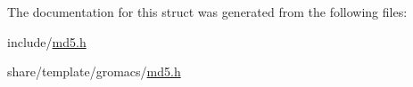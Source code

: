 \-The documentation for this struct was generated from the following files\-:\begin{DoxyCompactItemize}
\item 
include/\hyperlink{include_2md5_8h}{md5.\-h}\item 
share/template/gromacs/\hyperlink{share_2template_2gromacs_2md5_8h}{md5.\-h}\end{DoxyCompactItemize}
